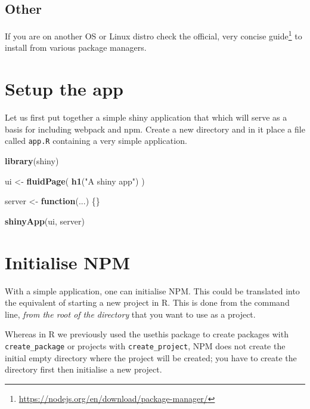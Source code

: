 \documentclass[
]{krantz}
\makeatletter
\newenvironment{Shaded}{\begin{snugshade}}{\end{snugshade}}
\newcommand{\ControlFlowTok}[1]{\textcolor[rgb]{0.27,0.27,0.27}{\textbf{#1}}}
\newcommand{\KeywordTok}[1]{\textcolor[rgb]{0.27,0.27,0.27}{\textbf{#1}}}
\newcommand{\NormalTok}[1]{#1}
\newcommand{\StringTok}[1]{\textcolor[rgb]{0.5,0.5,0.5}{#1}}
\renewcommand{\href}[2]{#2\footnote{\url{#1}}}
\newenvironment{kframe}{%
\medskip{}
\setlength{\fboxsep}{.8em}
 \def\at@end@of@kframe{}%
 \ifinner\ifhmode%
  \def\at@end@of@kframe{\end{minipage}}%
  \begin{minipage}{\columnwidth}%
 \fi\fi%
 \def\FrameCommand##1{\hskip\@totalleftmargin \hskip-\fboxsep
 \colorbox{shadecolor}{##1}\hskip-\fboxsep
     \hskip-\linewidth \hskip-\@totalleftmargin \hskip\columnwidth}%
 \MakeFramed {\advance\hsize-\width
   \@totalleftmargin\z@ \linewidth\hsize
   \@setminipage}}%
 {\par\unskip\endMakeFramed%
 \at@end@of@kframe}
\renewenvironment{Shaded}{\begin{kframe}}{\end{kframe}}
\makeatother
\begin{document}
\hypertarget{webpack-intro-install-other}{%
\subsection{Other}\label{webpack-intro-install-other}}

If you are on another OS or Linux distro check the official, very concise \href{https://nodejs.org/en/download/package-manager/}{guide} to install from various package managers.

\hypertarget{webpack-intro-setup}{%
\section{Setup the app}\label{webpack-intro-setup}}

Let us first put together a simple shiny application that which will serve as a basis for including webpack and npm. Create a new directory and in it place a file called \texttt{app.R} containing a very simple application.

\begin{Shaded}
\begin{Highlighting}[]
\KeywordTok{library}\NormalTok{(shiny)}

\NormalTok{ui <{-}}\StringTok{ }\KeywordTok{fluidPage}\NormalTok{(}
  \KeywordTok{h1}\NormalTok{(}\StringTok{"A shiny app"}\NormalTok{)}
\NormalTok{)}

\NormalTok{server <{-}}\StringTok{ }\ControlFlowTok{function}\NormalTok{(...) \{\}}

\KeywordTok{shinyApp}\NormalTok{(ui, server)}
\end{Highlighting}
\end{Shaded}

\hypertarget{webpack-intro-init-npm}{%
\section{Initialise NPM}\label{webpack-intro-init-npm}}

With a simple application, one can initialise NPM. This could be translated into the equivalent of starting a new project in R. This is done from the command line, \emph{from the root of the directory} that you want to use as a project.

Whereas in R we previously used the usethis package to create packages with \texttt{create\_package} or projects with \texttt{create\_project}, NPM does not create the initial empty directory where the project will be created; you have to create the directory first then initialise a new project.
\end{document}
